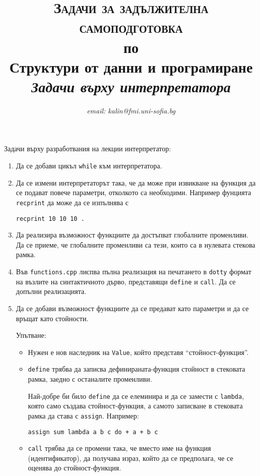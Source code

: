 \documentclass[12pt,a4paper]{article}
\author{\textit{email: kalin@fmi.uni-sofia.bg}}
\title{\textsc{Задачи за задължителна самоподготовка} \\
по \\
Структури от данни и програмиране\\
\textit{Задачи върху интерпретатора}}
\begin{document}
\maketitle

Задачи върху разработвания на лекции интерпретатор:

\begin{enumerate}

	\item Да се добави цикъл \texttt{while} към интерпретатора.

	\item Да се измени интерпретаторът така, че да може при извикване на функция да се подават повече параметри, отколкото са необходими. Например фунцията \texttt{recprint} да може да се изпълнява с

	 \texttt{recprint 10 10 10 .}


	\item Да реализира възможност функциите да достъпват глобалните променливи. Да се приеме, че глобалните променливи са тези, които са в нулевата стекова рамка.

	\item Във \texttt{functions.cpp} лиспва пълна реализация на печатането в \texttt{dotty} формат на възлите на синтактичното дърво, представящи \texttt{define} и \texttt{call}. Да се допълни реализацията.

	\item Да се добави възможност функциите да се предават като параметри и да се връщат като стойности. 

	\begin{flushleft}
	Упътване: 
	\begin{itemize}
		\item Нужен е нов наследник на \texttt{Value}, който представя ``стойност-функция''. 
		\item \texttt{define} трябва да записва дефинираната-функция стойност в стековата рамка, заедно с останалите променливи. 

		Най-добре би било \texttt{define} да се елеминира и да се замести с \texttt{lambda}, която само създава стойност-функция, а самото записване в стековата рамка да става с \texttt{assign}. Например:

		\texttt{assign sum lambda a b c do + a + b c}


		\item \texttt{call} трябва да се промени така, че вместо име на функция (идентификатор), да получава израз, който да се предполага, че се оценява до стойност-функция. 
	\end{itemize}
		

\end{flushleft}
\end{enumerate}
\end{document}
